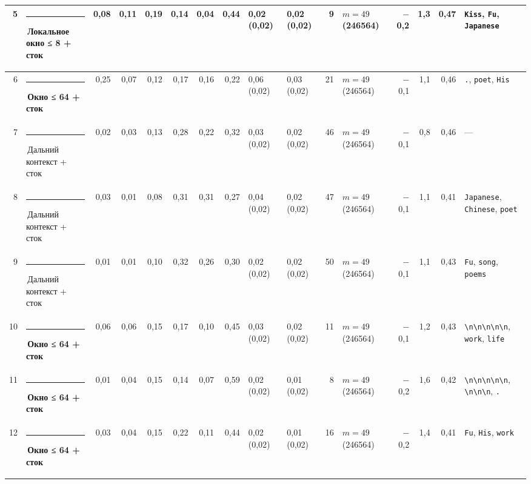 \documentclass[10pt]{article}
\begin{document}
\begin{minipage}{\linewidth}
\begin{center}
{\begin{tabular}{|r|l|r|r|r|r|r|r|l|l|r|l|r|r|r|l|}
5 & \textcolor[HTML]{1BAF7A}{\rule{0.62em}{0.62em}}\,\textbf{Локальное окно ≤ 8 + сток} & 0,08 & 0,11 & 0,19 & 0,14 & 0,04 & 0,44 & 0,02 (0,02) & 0,02 (0,02) & 9 & $m{=}49$ (246564) & $-$0,2 & 1,3 & 0,47 & \texttt{\textvisiblespace{}Kiss}, \texttt{\textvisiblespace{}Fu}, \texttt{\textvisiblespace{}Japanese} \\ \hline
6 & \textcolor[HTML]{EDA100}{\rule{0.62em}{0.62em}}\,\textbf{Окно ≤ 64 + сток} & 0,25 & 0,07 & 0,12 & 0,17 & 0,16 & 0,22 & 0,06 (0,02) & 0,03 (0,02) & 21 & $m{=}49$ (246564) & $-$0,1 & 1,1 & 0,46 & \texttt{\textvisiblespace{}.}, \texttt{\textvisiblespace{}poet}, \texttt{\textvisiblespace{}His} \\ \hline
7 & \textcolor[HTML]{C3C2B7}{\rule{0.62em}{0.62em}}\,Дальний контекст + сток & 0,02 & 0,03 & 0,13 & 0,28 & 0,22 & 0,32 & 0,03 (0,02) & 0,02 (0,02) & 46 & $m{=}49$ (246564) & $-$0,1 & 0,8 & 0,46 & — \\ \hline
8 & \textcolor[HTML]{C3C2B7}{\rule{0.62em}{0.62em}}\,Дальний контекст + сток & 0,03 & 0,01 & 0,08 & 0,31 & 0,31 & 0,27 & 0,04 (0,02) & 0,02 (0,02) & 47 & $m{=}49$ (246564) & $-$0,1 & 1,1 & 0,41 & \texttt{\textvisiblespace{}Japanese}, \texttt{\textvisiblespace{}Chinese}, \texttt{\textvisiblespace{}poet} \\ \hline
9 & \textcolor[HTML]{C3C2B7}{\rule{0.62em}{0.62em}}\,Дальний контекст + сток & 0,01 & 0,01 & 0,10 & 0,32 & 0,26 & 0,30 & 0,02 (0,02) & 0,02 (0,02) & 50 & $m{=}49$ (246564) & $-$0,1 & 1,1 & 0,43 & \texttt{\textvisiblespace{}Fu}, \texttt{\textvisiblespace{}song}, \texttt{\textvisiblespace{}poems} \\ \hline
10 & \textcolor[HTML]{EDA100}{\rule{0.62em}{0.62em}}\,\textbf{Окно ≤ 64 + сток} & 0,06 & 0,06 & 0,15 & 0,17 & 0,10 & 0,45 & 0,03 (0,02) & 0,02 (0,02) & 11 & $m{=}49$ (246564) & $-$0,1 & 1,2 & 0,43 & \texttt{\textvisiblespace{}\textbackslash{}n\textbackslash{}n\textbackslash{}n\textbackslash{}n\textbackslash{}n}, \texttt{\textvisiblespace{}work}, \texttt{\textvisiblespace{}life} \\ \hline
11 & \textcolor[HTML]{EDA100}{\rule{0.62em}{0.62em}}\,\textbf{Окно ≤ 64 + сток} & 0,01 & 0,04 & 0,15 & 0,14 & 0,07 & 0,59 & 0,02 (0,02) & 0,01 (0,02) & 8 & $m{=}49$ (246564) & $-$0,2 & 1,6 & 0,42 & \texttt{\textvisiblespace{}\textbackslash{}n\textbackslash{}n\textbackslash{}n\textbackslash{}n\textbackslash{}n}, \texttt{\textvisiblespace{}\textbackslash{}n\textbackslash{}n\textbackslash{}n}, \texttt{\textvisiblespace{}.} \\ \hline
12 & \textcolor[HTML]{EDA100}{\rule{0.62em}{0.62em}}\,\textbf{Окно ≤ 64 + сток} & 0,03 & 0,04 & 0,15 & 0,22 & 0,11 & 0,44 & 0,02 (0,02) & 0,01 (0,02) & 16 & $m{=}49$ (246564) & $-$0,2 & 1,4 & 0,41 & \texttt{\textvisiblespace{}Fu}, \texttt{\textvisiblespace{}His}, \texttt{\textvisiblespace{}work} \\ \hline

\end{tabular}}
\end{center}
\end{minipage}
\end{document}
